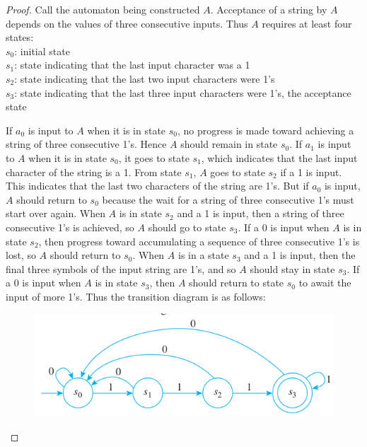 \documentclass[14pt]{extarticle}
\begin{document}
\begin{proof}
    Call the automaton being constructed \(A\). Acceptance of a string by \(A\) depends on the values of three consecutive
    inputs. Thus \(A\) requires at least four states: \\
    \(s_0\): initial state \\
    \(s_1\): state indicating that the last input character was a 1 \\
    \(s_2\): state indicating that the last two input characters were 1’s \\
    \(s_3\): state indicating that the last three input characters were 1’s, the acceptance state

    If \(a_0\) is input to \(A\) when it is in state \(s_0\), no progress is made toward achieving a string of three
    consecutive 1’s. Hence \(A\) should remain in state \(s_0\). If \(a_1\) is input to \(A\) when it is in state \(s_0\), it
    goes to state \(s_1\), which indicates that the last input
    character of the string is a 1. From state \(s_1\), \(A\) goes to state \(s_2\) if a 1 is input. This indicates that the last
    two characters of the string are 1’s. But if \(a_0\) is input, \(A\) should return to \(s_0\) because the wait for a string
    of three consecutive 1’s must start over again. When \(A\) is in state \(s_2\) and a 1 is input, then a string of three
    consecutive 1’s is achieved, so \(A\) should go to state \(s_3\). If a 0 is input when \(A\) is in state \(s_2\), then
    progress toward accumulating a sequence of three consecutive 1’s is lost, so \(A\) should return to \(s_0\). When \(A\) is
    in a state \(s_3\) and a 1 is input, then the final three symbols of the input string are 1’s, and so \(A\) should stay
    in state \(s_3\). If a 0 is input when \(A\) is in state \(s_3\), then \(A\) should return to state \(s_0\) to await the
    input of more 1’s. Thus the transition diagram is as follows:

    \begin{figure}[ht!]
        \centering
        \includegraphics[scale=0.5]{../images/12.2.20.a.png}
    \end{figure}
\end{proof}
\end{document}
